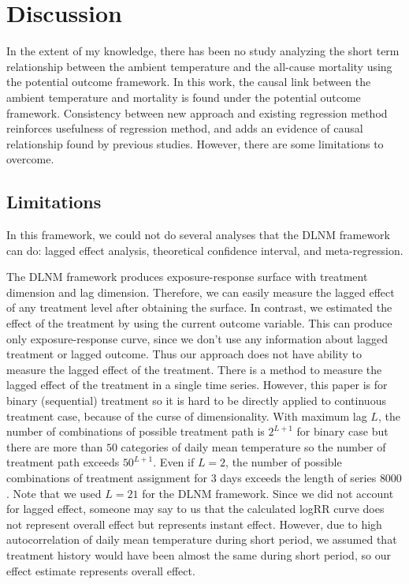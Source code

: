 \documentclass[12pt]{article}
\begin{document}
\section{Discussion}

In the extent of my knowledge, there has been no study analyzing the short term relationship 
between the ambient temperature and the all-cause mortality using the potential outcome framework.
In this work, the causal link between the ambient temperature and mortality 
is found under the potential outcome framework.
Consistency between new approach and existing regression method reinforces
usefulness of regression method, and adds an evidence of causal relationship found by previous studies.
However, there are some limitations to overcome.

\subsection{Limitations}

In this framework, we could not do several analyses that the DLNM framework can do:
lagged effect analysis, theoretical confidence interval, and meta-regression.

The DLNM framework produces exposure-response surface with treatment dimension and lag dimension.
Therefore, we can easily measure the lagged effect of any treatment level after obtaining the surface.
In contrast, we estimated the effect of the treatment by using the current outcome variable.
This can produce only exposure-response curve, 
since we don't use any information about lagged treatment or lagged outcome.
Thus our approach does not have ability to measure the lagged effect of the treatment.
There is a method to measure the lagged effect of the treatment in a single time series\cite{bojinov2019}.
However, this paper is for binary (sequential) treatment 
so it is hard to be directly applied to continuous treatment case,
because of the curse of dimensionality.
With maximum lag $L$, the number of combinations of possible treatment path is $2^{L+1}$ for binary case
but there are more than $50$ categories of daily mean temperature 
so the number of treatment path exceeds $50^{L+1}$.
Even if $L = 2$, 
the number of possible combinations of treatment assignment for 3 days exceeds the length of series $8000$.
Note that we used $L = 21$ for the DLNM framework.
Since we did not account for lagged effect, someone may say to us that 
the calculated logRR curve does not represent overall effect but represents instant effect.
However, due to high autocorrelation of daily mean temperature during short period, 
we assumed that treatment history would have been almost the same during short period,
so our effect estimate represents overall effect.
\end{document}
